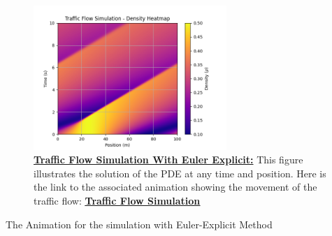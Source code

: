 \documentclass{beamer}
\begin{document}
\begin{frame}
	\begin{figure}[H]
		\centering
		\includegraphics[width=0.65\textwidth]{traffic_flow_density_map.png}
		\caption[Traffic Flow Simulation With Euler Explicit]{\textbf{\underline{Traffic Flow Simulation With Euler Explicit:}} This figure illustrates the solution of the PDE at any time and position. Here is the link to the associated animation showing the movement of the traffic flow: \href{https://github.com/FlorentGerbaud/Simple-road-traffic-modeling/blob/Flo-PDE/SRTM/EDPMethod/CasTestToLaunch/TestToLaunch/Modele_IC_S/EulerExplicit/traffic_flow_animation.gif}{\textbf{\underline{Traffic Flow Simulation}}} }
		\label{fig:traffic_flow_density_map}
	\end{figure}
\end{frame}

\begin{frame}{The Animation for the simulation with Euler-Explicit Method}
	\centering
\end{frame}
\end{document}
